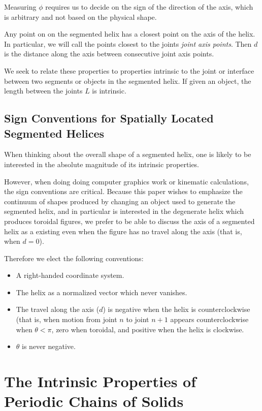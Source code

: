 \documentclass[11pt]{article}
\begin{document}
{Measuring $\phi$ requires us to decide on the sign of the direction of the axis, which is arbitrary and not based on the
physical shape.

Any point on on the segmented helix has a closest point on the axis of the helix. In particular, we will call the points closest to the
joints {\em joint axis points}. Then $d$ is the distance along the axis between consecutive joint axis points.

We seek to relate these properties to properties intrinsic to the joint or interface between
two segments or objects in the segmented helix. If given an object, the length between the joints $L$ is intrinsic.

\label{sec:SegmentedHelix}

\subsection{Sign Conventions for Spatially Located Segmented Helices}

When thinking about the overall shape of a segmented helix, one is
likely to be interested in the absolute magnitude of its intrinsic
properties.

However, when doing doing computer graphics work or kinematic
calculations, the sign conventions are critical. Because this
paper wishes to emphasize the continuum of shapes produced by
changing an object used to generate the segmented helix, and
in particular is interested in the degenerate helix which
produces toroidal figures, we prefer to be able to discuss
the axis of a segmented helix as a existing even when the
figure has no travel along the axis (that is, when $d = 0$).

Therefore we elect the following conventions:
\begin{itemize}
\item A right-handed coordinate system.
\item The helix as a normalized vector
  which never vanishes.
\item The travel along the axis ($d$) is negative when
  the helix is counterclockwise (that is, when motion from
  joint $n$ to joint $n+1$ appears counterclockwise when $\theta < \pi$,
  zero when toroidal, and
  positive when the helix is clockwise.
\item $\theta$ is never negative.
\end{itemize}

\section{The Intrinsic Properties of Periodic Chains of Solids}

}
\end{document}
